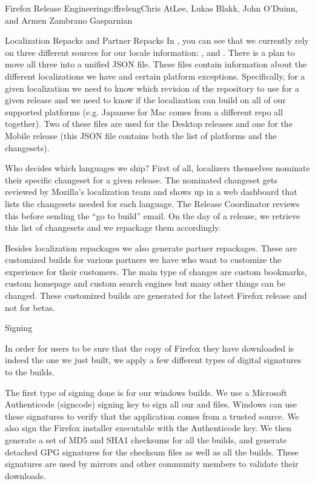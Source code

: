 \begin{aosachapter}{Firefox Release Engineering}{s:ffreleng}{Chris AtLee, Lukas Blakk, John O'Duinn, and Armen Zambrano Gasparnian}
\begin{aosasect1}{Localization Repacks and Partner Repacks}
In , you can see that we currently rely
on three different sources for our locale information:
,  and
. There is a plan to move
all three into a unified JSON file.  These files contain information
about the different localizations we have and certain platform
exceptions.  Specifically, for a given localization we need to know
which revision of the repository to use for a given release and we
need to know if the localization can build on all of our supported
platforms (e.g.  Japanese for Mac comes from a different repo all
together).  Two of these files are used for the Desktop releases and
one for the Mobile release (this JSON file contains both the list of
platforms and the changesets).

Who decides which languages we ship? First of all, localizers
themselves nominate their specific changeset for a given release. The
nominated changeset gets reviewed by Mozilla's localization team and
shows up in a web dashboard that lists the changesets needed for each
language. The Release Coordinator reviews this before sending the ``go
to build'' email. On the day of a release, we retrieve this list of
changesets and we repackage them accordingly.

Besides localization repackages we also generate partner
repackages. These are customized builds for various partners we have
who want to customize the experience for their customers.  The main
type of changes are custom bookmarks, custom homepage and custom
search engines but many other things can be changed. These customized
builds are generated for the latest Firefox release and not for betas.

\end{aosasect1}

\begin{aosasect1}{Signing}

In order for users to be sure that the copy of Firefox they have
downloaded is indeed the one we just built, we apply a few different
types of digital signatures to the builds.

The first type of signing done is for our windows builds. We use a
Microsoft Authenticode (signcode) signing key to sign all our
 and  files. Windows can use these signatures to
verify that the application comes from a trusted source. We also sign
the Firefox installer executable with the Authenticode key.  We then
generate a set of MD5 and SHA1 checksums for all the builds, and
generate detached GPG signatures for the checksum files as well as all
the builds. These signatures are used by mirrors and other community
members to validate their downloads.


\end{aosasect1}
\end{aosachapter}
